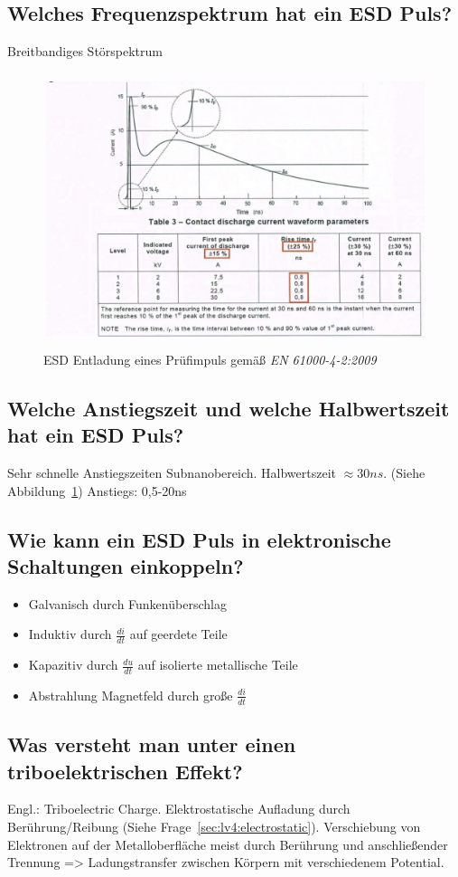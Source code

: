 \subsection{Welches Frequenzspektrum hat ein ESD Puls?}
Breitbandiges Störspektrum

\begin{figure}[ht]
  \centering
  \includegraphics[height=8cm]{src/assets/pictures/lv4_esd_impuls.png}
  \caption{ESD Entladung eines Prüfimpuls gemäß \textit{EN 61000-4-2:2009}}\label{fig:lv4:esd_impuls}
\end{figure}

\subsection{Welche Anstiegszeit und welche Halbwertszeit hat ein ESD Puls?}
Sehr schnelle Anstiegszeiten Subnanobereich. Halbwertszeit \(\approx 30ns\). (Siehe Abbildung~\ref{fig:lv4:esd_impuls})
Anstiegs: 0,5-20ns

\subsection{Wie kann ein ESD Puls in elektronische Schaltungen einkoppeln?}
\begin{itemize}
  \item Galvanisch durch Funkenüberschlag
  \item Induktiv durch \(\frac{di}{dt}\) auf geerdete Teile
  \item Kapazitiv durch \(\frac{du}{dt}\) auf isolierte metallische Teile
  \item Abstrahlung Magnetfeld durch große \(\frac{di}{dt}\)
\end{itemize}

\subsection{Was versteht man unter einen triboelektrischen Effekt?}
Engl.: Triboelectric Charge. Elektrostatische Aufladung durch Berührung/Reibung (Siehe Frage~\ref{sec:lv4:electrostatic}). Verschiebung von Elektronen auf der Metalloberfläche meist durch Berührung und anschließender Trennung => Ladungstransfer zwischen Körpern mit verschiedenem Potential.

